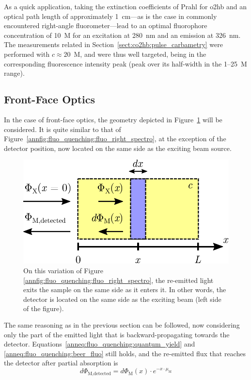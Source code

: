 As a quick application, taking the extinction coefficients of Prahl\cite{prahl1998} for \gls{o2hb} and an optical path length of approximately 1~cm---as is the case in commonly encountered right-angle fluorometer---lead to an optimal fluorophore concentration of 10~{\textmu}M for an excitation at 280~nm and an emission at 326~nm. The measurements related in Section~\ref{sect:co2hb:pulse_carbametry} were performed with $c\approx20$~{\textmu}M, and were thus well targeted, being in the corresponding fluorescence intensity peak (peak over its half-width in the 1--25~{\textmu}M range).

\subsection{Front-Face Optics}

In the case of front-face optics, the geometry depicted in Figure~\ref{annfig:fluo_quenching:fluo_front_spectro} will be considered. It is quite similar to that of Figure~\ref{annfig:fluo_quenching:fluo_right_spectro}, at the exception of the detector position, now located on the same side as the exciting beam source.

\begin{figure}
	\centering
	\includegraphics[scale=0.7]{2_appendices/figures/front_face_scheme.pdf}
	\caption[Front-face optics scheme.]{On this variation of Figure \ref{annfig:fluo_quenching:fluo_right_spectro}, the re-emitted light exits the sample on the same side as it enters it. In other words, the detector is located on the same side as the exciting beam (left side of the figure).}
	\label{annfig:fluo_quenching:fluo_front_spectro}
\end{figure}

The same reasoning as in the previous section can be followed, now considering only the part of the emitted light that is backward-propagating towards the detector. Equations~\ref{anneq:fluo_quenching:quantum_yield} and \ref{anneq:fluo_quenching:beer_fluo} still holds, and the re-emitted flux that reaches the detector after partial absorption is
\begin{equation}
	d\Phi_\text{M,detected} = d\Phi_\text{M}(x) \cdot e^{-x \cdot \mu_\text{M}}
\end{equation}

